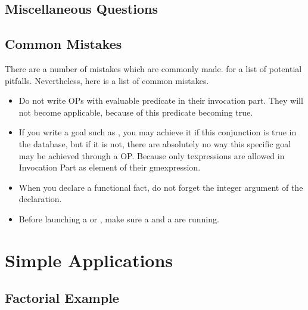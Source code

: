 \section{Miscellaneous Questions}


\section{Common Mistakes}

There are a number of mistakes which are commonly made.  for a list of potential pitfalls. Nevertheless, here is
a list of common mistakes.

\begin{itemize}

\item Do not write OPs with evaluable predicate in their invocation part.
They will not become applicable, because of this predicate becoming true.

\item If you write a goal such as ,
you may achieve it if this conjunction is true in the database, but if it
is not, there are absolutely no way this specific goal may be achieved
through a OP. Because only texpressions are allowed in Invocation Part as
element of their gmexpression.

\item When you declare a functional fact, do not forget the integer argument of
the declaration.

\item Before launching a \XPK{} or \CPK{}, make sure a \OPRSS{} and a \MP{}
are running.

\end{itemize}

\chapter{Simple \COPRS{} Applications}



\section{Factorial Example}

